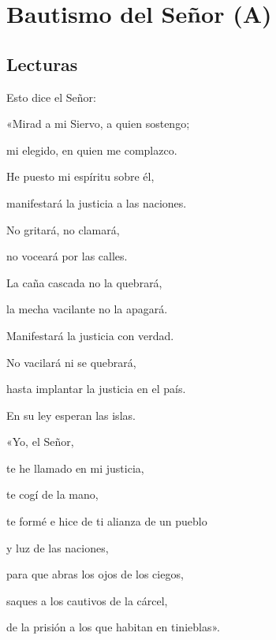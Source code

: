\chapter{Bautismo del Señor (A)}

	\section{Lecturas}

		
		 
		
		
		\begin{scripture}
			Esto dice el Señor:
			
			«Mirad a mi Siervo, a quien sostengo;
			
			mi elegido, en quien me complazco.
			
			He puesto mi espíritu sobre él,
			
			manifestará la justicia a las naciones.
			
			No gritará, no clamará,
			
			no voceará por las calles.
			
			La caña cascada no la quebrará,
			
			la mecha vacilante no la apagará.
			
			Manifestará la justicia con verdad.
			
			No vacilará ni se quebrará,
			
			hasta implantar la justicia en el país.
			
			En su ley esperan las islas.
			
			«Yo, el Señor,
			
			te he llamado en mi justicia,
			
			te cogí de la mano,
			
			te formé e hice de ti alianza de un pueblo
			
			y luz de las naciones,
			
			para que abras los ojos de los ciegos,
			
			saques a los cautivos de la cárcel,
			
			de la prisión a los que habitan en tinieblas».
		\end{scripture}
	

		
		 
		
